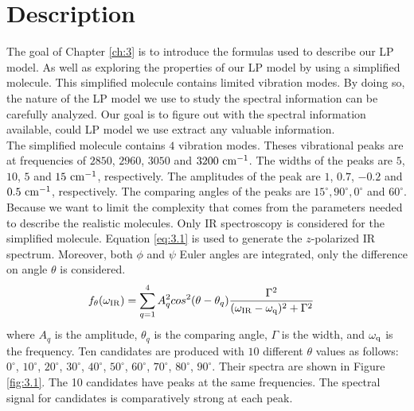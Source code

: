  \label{ch:3}

\section{Description}
The goal of Chapter \ref{ch:3} is to introduce the formulas used to describe our LP model. As well as exploring the properties of our LP model by using a simplified molecule. This simplified molecule contains limited vibration modes. By doing so, the nature of the LP model we use to study the spectral information can be carefully analyzed. Our goal is to figure out with the spectral information available, could LP model we use extract any valuable information. \\

The simplified molecule contains $4$ vibration modes. Theses vibrational peaks are at frequencies of $2850$, $2960$, $3050$ and $3200~\rm cm^{-1}$. The widths of the peaks are $5$, $10$, $5$ and $15~\rm cm^{-1}$, respectively. The amplitudes of the peak are $1$, $0.7$, $-0.2$ and $0.5~\rm cm^{-1}$, respectively. The comparing angles of the peaks are $15^{\circ}, 90^{\circ}, 0^{\circ}$ and $60^{\circ}$. \\

Because we want to limit the complexity that comes from the parameters needed to describe the realistic molecules. Only IR spectroscopy is considered for the simplified molecule. Equation \ref{eq:3.1} is used to generate the $z$-polarized IR spectrum. Moreover, both $\phi$ and $\psi$ Euler angles are integrated, only the difference on angle $\theta$ is considered. \\

\begin{eqnarray} \label{eq:3.1}
& f_{\theta}(\omega_{\rm IR}) = \displaystyle\sum^{4}_{q=1} A_q^2 cos^2(\theta - \theta_q)\frac{\Gamma^2}{(\omega_{\rm IR}- \omega_{\rm q})^2 + \Gamma^2} 
\end{eqnarray}
where $A_{q}$ is the amplitude, $\theta_{q}$ is the comparing angle, $\Gamma$ is the width, and $\omega_{\rm q}$ is the frequency. Ten candidates are produced with $10$ different $\theta$ values as follows: $0^{\circ}$, $10^{\circ}$, $20^{\circ}$, $30^{\circ}$, $40^{\circ}$, $50^{\circ}$, $60^{\circ}$, $70^{\circ}$, $80^{\circ}$, $90^{\circ}$. Their spectra are shown in Figure \ref{fig:3.1}. The 10 candidates have peaks at the same frequencies. The spectral signal for candidates is comparatively strong at each peak. \\

